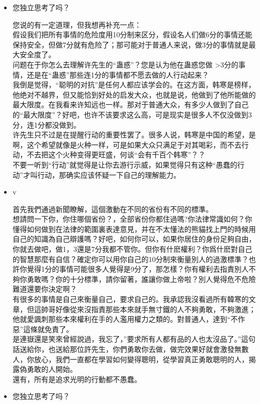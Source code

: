 \begin{itemize}[<+->]
\item
  您独立思考了吗？

  您说的有一定道理，但我想再补充一点：\\
  假设我们把所有事情的危险度用10分制来区分，假设名人们做6分的事情还能保持安全，但做7分就有危险了；那可能对于普通人来说，做3分的事情就是最大安全度了。\\
  问题在于你怎么去理解许先生的``蛊惑''？您是认为他在蛊惑您做
  \textgreater{}3分的事情，还是在``蛊惑''那些连1分的事情都不愿去做的人行动起来？\\
  我倒是觉得，``聪明的对抗''是任何人都应该学会的。在这方面，韩寒是榜样，他绝对不越界，但又能恰到好处的启发大众，也就是说，他做到了他所能做的最大限度。在我看来许知远也一样。那对于普通大众，有多少人做到了自己的``最大限度''？好吧，也许不该要求这么高，可是现实是很多人不仅没做到3分，连1分都没做到。\\
  许先生只不过是在提醒行动的重要性罢了。很多人说，韩寒是中国的希望，是啊，这个希望就像是火种一样，可是如果大众只满足于对其喝彩，而不去行动，不去把这个火种变得更旺盛，何谈``会有千百个韩寒''？？\\
  不要一听到``行动''就觉得是让你去游行示威，如果觉得只有这种``愚蠢的行动''才叫行动，那确实应该怀疑一下自己的理解能力。
\item
  v

  首先我們通過新聞瞭解，這個激動在不同的省份有不同的標準。\\
  想請問一下你，你住哪個省份？，全部省份你都住過嗎?你法律常識如何？你懂得如何做到在法律的範圍裏表達意見，并在不太懂法的熊貓找上門的時候用自己的知識為自己辯護嗎？好吧，如何你可以，如果你居住的身份足夠自由，你就去做吧，做1，3還是7分我都不管你。但你有什麽權利？你爲什麽對自己的智慧那麼有自信？確定你可以用你自己的10分制來衡量別人的過激標準？也許你覺得1分的事情可能很多人覺得是9分了，那怎樣？你有權利去指責別人不夠你勇敢嗎？你的十分標準，請你留著，誰讓你做上帝啦？別人覺得危不危險難道還要你決定啊？\\
  有很多的事情是自己來衡量自己，要求自己的。我承認我沒看過所有韓寒的文章，但這帥哥好像從來沒指責那些本來就手無寸鐵的人不夠勇敢，不夠激進；他就愛諷刺那些本來權利在手的人濫用權力之類的。對普通人，達到``不作惡''這條就免責了。\\
  是連嶽還是笑來曾經說過，我忘了，''要求所有人都有品的人也太沒品了。''這句話送給你，也送給那位許先生，你們勇敢你去做，做完效果好就會激發無數人，你放心，我們一直都在學習如何變得聰明，從學習真正勇敢聰明的人，揭露偽勇敢的人開始。\\
  還有，所有是追求光明的行動都不愚蠢。
\item
  您独立思考了吗？


\end{itemize}
